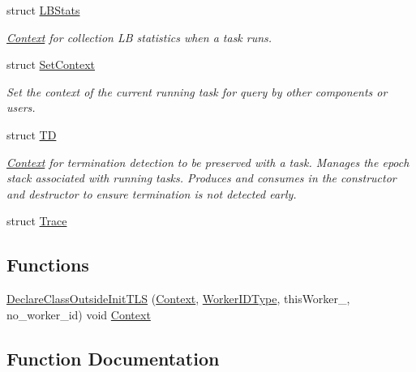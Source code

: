 \begin{DoxyCompactItemize}
struct \hyperlink{structvt_1_1ctx_1_1_l_b_stats}{L\+B\+Stats}
\begin{DoxyCompactList}\small\item\em \hyperlink{structvt_1_1ctx_1_1_context}{Context} for collection LB statistics when a task runs. \end{DoxyCompactList}\item 
struct \hyperlink{structvt_1_1ctx_1_1_set_context}{Set\+Context}
\begin{DoxyCompactList}\small\item\em Set the context of the current running task for query by other components or users. \end{DoxyCompactList}\item 
struct \hyperlink{structvt_1_1ctx_1_1_t_d}{TD}
\begin{DoxyCompactList}\small\item\em \hyperlink{structvt_1_1ctx_1_1_context}{Context} for termination detection to be preserved with a task. Manages the epoch stack associated with running tasks. Produces and consumes in the constructor and destructor to ensure termination is not detected early. \end{DoxyCompactList}\item 
struct \hyperlink{structvt_1_1ctx_1_1_trace}{Trace}
\end{DoxyCompactItemize}
\subsection*{Functions}
\begin{DoxyCompactItemize}
\item 
\hyperlink{namespacevt_1_1ctx_a2b0a82bed85b7c9b0e1c72829319118a}{Declare\+Class\+Outside\+Init\+T\+LS} (\hyperlink{structvt_1_1ctx_1_1_context}{Context}, \hyperlink{namespacevt_a656e362091da17b9b93d0655b36e3392}{Worker\+I\+D\+Type}, this\+Worker\+\_\+, no\+\_\+worker\+\_\+id) void \hyperlink{structvt_1_1ctx_1_1_context}{Context}
\end{DoxyCompactItemize}


\subsection{Function Documentation}
\mbox{\label{namespacevt_1_1ctx_a2b0a82bed85b7c9b0e1c72829319118a}} 

